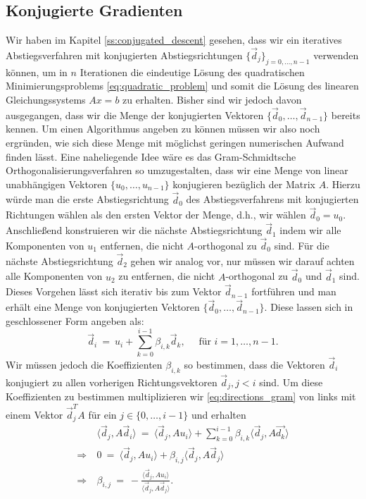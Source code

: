 \subsection{Konjugierte Gradienten}
\label{ss:conjugated_gradients}
Wir haben im Kapitel \ref{ss:conjugated_descent} gesehen, dass wir ein iteratives Abstiegsverfahren mit konjugierten Abstiegsrichtungen $\lbrace \vec{d}_j \rbrace_{j=0,\ldots,n-1}$ verwenden können, um in $n$ Iterationen die eindeutige Lösung des quadratischen Minimierungsproblems \eqref{eq:quadratic_problem} und somit die Lösung des linearen Gleichungssystems $Ax = b$ zu erhalten.
Bisher sind wir jedoch davon ausgegangen, dass wir die Menge der konjugierten Vektoren $\lbrace \vec{d}_0, \ldots, \vec{d}_{n-1} \rbrace$ bereits kennen.
Um einen Algorithmus angeben zu können müssen wir also noch ergründen, wie sich diese Menge mit möglichst geringen numerischen Aufwand finden lässt.
Eine naheliegende Idee wäre es das Gram-Schmidtsche Orthogonalisierungsverfahren so umzugestalten, dass wir eine Menge von linear unabhängigen Vektoren $\lbrace u_0,\ldots, u_{n-1} \rbrace$ konjugieren bezüglich der Matrix $A$.
Hierzu würde man die erste Abstiegsrichtung $\vec{d}_0$ des Abstiegsverfahrens mit konjugierten Richtungen wählen als den ersten Vektor der Menge, d.h., wir wählen $\vec{d}_0 = u_0$.
Anschließend konstruieren wir die nächste Abstiegsrichtung $\vec{d}_1$ indem wir alle Komponenten von $u_1$ entfernen, die nicht $A$-orthogonal zu $\vec{d}_0$ sind.
Für die nächste Abstiegsrichtung $\vec{d}_2$ gehen wir analog vor, nur müssen wir darauf achten alle Komponenten von $u_2$ zu entfernen, die nicht $A$-orthogonal zu $\vec{d}_0$ und $\vec{d}_1$ sind.
Dieses Vorgehen lässt sich iterativ bis zum Vektor $\vec{d}_{n-1}$ fortführen und man erhält eine Menge von konjugierten Vektoren $\lbrace \vec{d}_0, \ldots, \vec{d}_{n-1} \rbrace$. Diese lassen sich in geschlossener Form angeben als:
\begin{equation}
\label{eq:directions_gram}
\vec{d}_i \ = \ u_i + \sum_{k=0}^{i-1} \beta_{i,k} \vec{d}_k, \quad \text{ für } i=1,\ldots,n-1.
\end{equation}
Wir müssen jedoch die Koeffizienten $\beta_{i,k}$ so bestimmen, dass die Vektoren $\vec{d}_i$ konjugiert zu allen vorherigen Richtungsvektoren $\vec{d}_j, j < i$ sind.
Um diese Koeffizienten zu bestimmen multiplizieren wir \eqref{eq:directions_gram} von links mit einem Vektor $\vec{d}_j^TA$ für ein $j \in \lbrace 0,\ldots,i-1\rbrace$ und erhalten
\begin{equation*}
\begin{split}
&\langle \vec{d}_j, A \vec{d}_i \rangle \ = \ \langle \vec{d}_j, A u_i \rangle + \sum_{k=0}^{i-1} \beta_{i,k} \langle \vec{d}_j, A \vec{d_k} \rangle \\
\Rightarrow \ & 0 \ = \ \langle \vec{d}_j, Au_i \rangle + \beta_{i,j}\langle \vec{d}_j, A \vec{d}_j \rangle \\
\Rightarrow \ & \beta_{i,j} \ = \ - \frac{\langle \vec{d}_j, Au_i \rangle}{\langle \vec{d}_j, A\vec{d}_j \rangle}.
\end{split}
\end{equation*}
